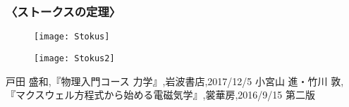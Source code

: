 \documentclass[10pt,b5paper,papersize,dvipdfmx]{jsbook}
\begin{document}
\subsubsection{〈ストークスの定理〉}
\begin{figure}[htbp]
  \begin{flushright}
  \texttt{[image: Stokus]}
  \end{flushright}
\end{figure}
\begin{figure}[htbp]
  \begin{flushright}
  \texttt{[image: Stokus2]}
  \end{flushright}
\end{figure}

\begin{thebibliography}{9}
 戸田 盛和,『物理入門コース 力学』,岩波書店,2017/12/5
 小宮山 進・竹川 敦,『マクスウェル方程式から始める電磁気学』,裳華房,2016/9/15 第二版

\end{thebibliography}

\end{document}
